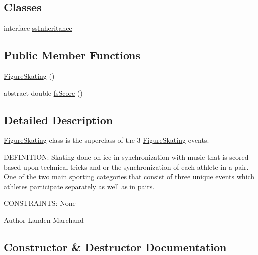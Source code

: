 \subsection*{Classes}
\begin{DoxyCompactItemize}
\item 
interface \hyperlink{interfaceProject__Codename__Olympia__v1_1_1__0_1_1FigureSkating_1_1ssInheritance}{ss\+Inheritance}
\end{DoxyCompactItemize}
\subsection*{Public Member Functions}
\begin{DoxyCompactItemize}
\item 
\hyperlink{classProject__Codename__Olympia__v1_1_1__0_1_1FigureSkating_a8b84d8dab64fc0add779a2579c3df1b0}{Figure\+Skating} ()
\item 
abstract double \hyperlink{classProject__Codename__Olympia__v1_1_1__0_1_1FigureSkating_a437e794fec382863421f8c65e31295f8}{fs\+Score} ()
\end{DoxyCompactItemize}


\subsection{Detailed Description}
\hyperlink{classProject__Codename__Olympia__v1_1_1__0_1_1FigureSkating}{Figure\+Skating} class is the superclass of the 3 \hyperlink{classProject__Codename__Olympia__v1_1_1__0_1_1FigureSkating}{Figure\+Skating} events. 

D\+E\+F\+I\+N\+I\+T\+I\+ON\+: Skating done on ice in synchronization with music that is scored based upon technical tricks and or the synchronization of each athlete in a pair. One of the two main sporting categories that consist of three unique events which athletes participate separately as well as in pairs.

C\+O\+N\+S\+T\+R\+A\+I\+N\+TS\+: None\begin{DoxyAuthor}{Author}
Landen Marchand 
\end{DoxyAuthor}


\subsection{Constructor \& Destructor Documentation}
\mbox{\label{classProject__Codename__Olympia__v1_1_1__0_1_1FigureSkating_a8b84d8dab64fc0add779a2579c3df1b0}} 
